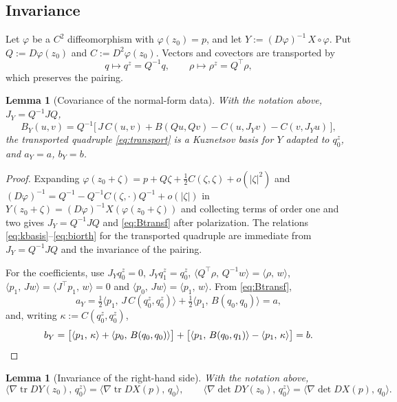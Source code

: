 \documentclass[12pt]{article}
\theoremstyle{plain}
\newtheorem{lemma}[theorem]{Lemma}
\theoremstyle{definition}
\theoremstyle{remark}
\newcommand{\tr}{\operatorname{tr}}
\DeclareMathOperator{\dt}{det}
\newcommand{\ip}[2]{\langle #1,\, #2\rangle}
\begin{document}
	\subsection{Invariance}
	
	Let $\varphi$ be a $C^{2}$ diffeomorphism with $\varphi(z_{0})=p$, and
	let $Y:=(D\varphi)^{-1}\,X\circ\varphi$.  Put $Q:=D\varphi(z_{0})$ and
	$C:=D^{2}\varphi(z_{0})$.  Vectors and covectors are transported by
	\begin{equation}\label{eq:transport}
		q\longmapsto q^{z}=Q^{-1}q,\qquad
		\rho\longmapsto \rho^{z}=Q^{\top}\rho ,
	\end{equation}
	which preserves the pairing.
	
	\begin{lemma}[Covariance of the normal-form data]\label{lem:invLHS}
		With the notation above, $J_{Y}=Q^{-1}JQ$,
		\begin{equation}\label{eq:Btransf}
			B_{Y}(u,v)=Q^{-1}\bigl[\,J\,C(u,v)+B(Qu,Qv)
			-C(u,J_{Y}v)-C(v,J_{Y}u)\,\bigr],
		\end{equation}
		the transported quadruple \eqref{eq:transport} is a Kuznetsov basis for
		$Y$ adapted to $q_{0}^{z}$, and $a_{Y}=a$, $b_{Y}=b$.
	\end{lemma}
	
	\begin{proof}
		Expanding $\varphi(z_{0}+\zeta)=p+Q\zeta+\tfrac12C(\zeta,\zeta)+o(|\zeta|^{2})$
		and
		$(D\varphi)^{-1}=Q^{-1}-Q^{-1}C(\zeta,\cdot)Q^{-1}+o(|\zeta|)$ in
		$Y(z_{0}+\zeta)=(D\varphi)^{-1}X(\varphi(z_{0}+\zeta))$ and collecting
		terms of order one and two gives $J_{Y}=Q^{-1}JQ$ and
		\eqref{eq:Btransf} after polarization.  The relations
		\eqref{eq:kbasis}--\eqref{eq:biorth} for the transported quadruple are
		immediate from $J_{Y}=Q^{-1}JQ$ and the invariance of the pairing.
		
		For the coefficients, use $J_{Y}q_{0}^{z}=0$, $J_{Y}q_{1}^{z}=q_{0}^{z}$,
		$\ip{Q^{\top}\rho}{Q^{-1}w}=\ip{\rho}{w}$,
		$\ip{p_{1}}{Jw}=\ip{J^{\top}p_{1}}{w}=0$ and
		$\ip{p_{0}}{Jw}=\ip{p_{1}}{w}$.  From \eqref{eq:Btransf},
		\[
		a_{Y}=\tfrac12\ip{p_{1}}{J\,C(q_{0}^{z},q_{0}^{z})}
		+\tfrac12\ip{p_{1}}{B(q_{0},q_{0})}=a ,
		\]
		and, writing $\kappa:=C(q_{0}^{z},q_{0}^{z})$,
		\[
		b_{Y}=\bigl[\ip{p_{1}}{\kappa}+\ip{p_{0}}{B(q_{0},q_{0})}\bigr]
		+\bigl[\ip{p_{1}}{B(q_{0},q_{1})}-\ip{p_{1}}{\kappa}\bigr]=b . \qedhere
		\]
	\end{proof}
	
	\begin{lemma}[Invariance of the right-hand side]\label{lem:invRHS}
		With the notation above,
		\[
		\ip{\nabla\!\tr DY(z_{0})}{q_{0}^{z}}=\ip{\nabla\!\tr DX(p)}{q_{0}},
		\qquad
		\ip{\nabla\!\dt DY(z_{0})}{q_{0}^{z}}=\ip{\nabla\!\dt DX(p)}{q_{0}} .
		\]
	\end{lemma}
	
\end{document}
